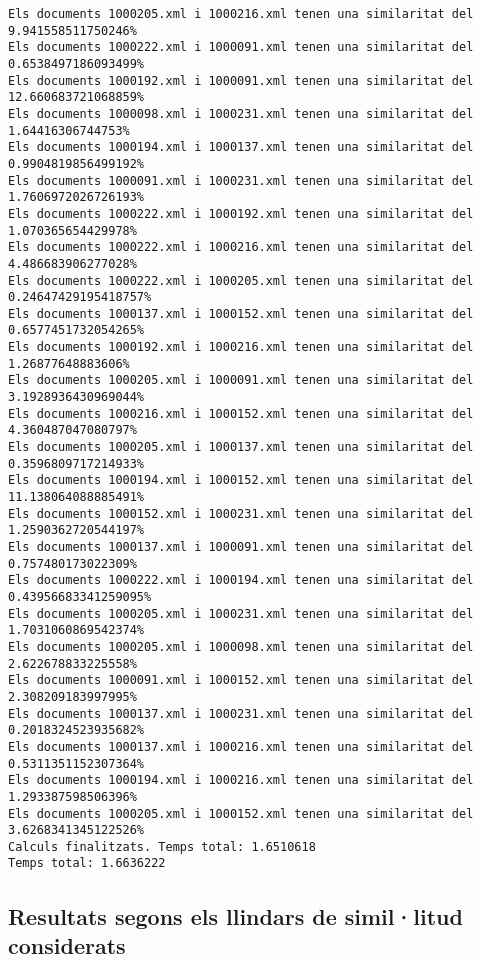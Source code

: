 \documentclass{report}
\begin{document}
\begin{verbatim}
Els documents 1000205.xml i 1000216.xml tenen una similaritat del 9.941558511750246%
Els documents 1000222.xml i 1000091.xml tenen una similaritat del 0.6538497186093499%
Els documents 1000192.xml i 1000091.xml tenen una similaritat del 12.660683721068859%
Els documents 1000098.xml i 1000231.xml tenen una similaritat del 1.64416306744753%
Els documents 1000194.xml i 1000137.xml tenen una similaritat del 0.9904819856499192%
Els documents 1000091.xml i 1000231.xml tenen una similaritat del 1.7606972026726193%
Els documents 1000222.xml i 1000192.xml tenen una similaritat del 1.070365654429978%
Els documents 1000222.xml i 1000216.xml tenen una similaritat del 4.486683906277028%
Els documents 1000222.xml i 1000205.xml tenen una similaritat del 0.24647429195418757%
Els documents 1000137.xml i 1000152.xml tenen una similaritat del 0.6577451732054265%
Els documents 1000192.xml i 1000216.xml tenen una similaritat del 1.26877648883606%
Els documents 1000205.xml i 1000091.xml tenen una similaritat del 3.1928936430969044%
Els documents 1000216.xml i 1000152.xml tenen una similaritat del 4.360487047080797%
Els documents 1000205.xml i 1000137.xml tenen una similaritat del 0.3596809717214933%
Els documents 1000194.xml i 1000152.xml tenen una similaritat del 11.138064088885491%
Els documents 1000152.xml i 1000231.xml tenen una similaritat del 1.2590362720544197%
Els documents 1000137.xml i 1000091.xml tenen una similaritat del 0.757480173022309%
Els documents 1000222.xml i 1000194.xml tenen una similaritat del 0.43956683341259095%
Els documents 1000205.xml i 1000231.xml tenen una similaritat del 1.7031060869542374%
Els documents 1000205.xml i 1000098.xml tenen una similaritat del 2.622678833225558%
Els documents 1000091.xml i 1000152.xml tenen una similaritat del 2.308209183997995%
Els documents 1000137.xml i 1000231.xml tenen una similaritat del 0.2018324523935682%
Els documents 1000137.xml i 1000216.xml tenen una similaritat del 0.5311351152307364%
Els documents 1000194.xml i 1000216.xml tenen una similaritat del 1.293387598506396%
Els documents 1000205.xml i 1000152.xml tenen una similaritat del 3.6268341345122526%
Calculs finalitzats. Temps total: 1.6510618
Temps total: 1.6636222

\end{verbatim}

\subsection{Resultats segons els llindars de simil·litud considerats}
\end{document}
